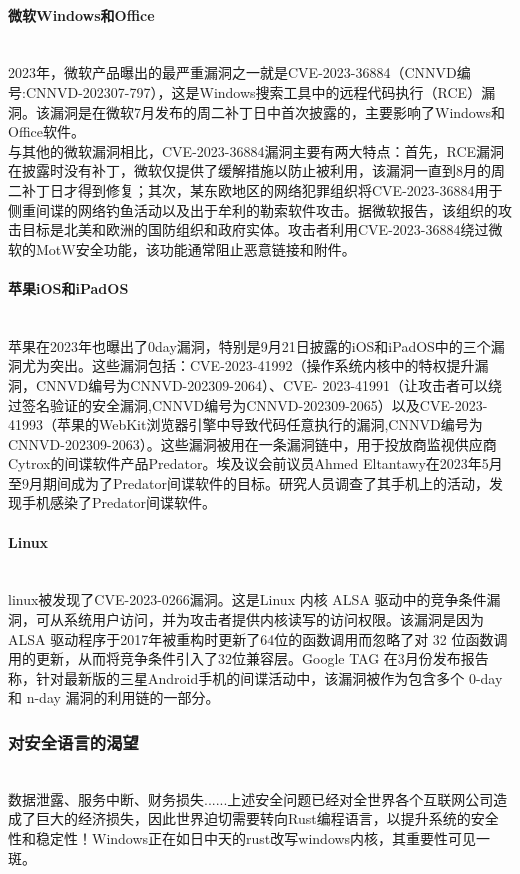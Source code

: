 \paragraph{微软Windows和Office}\ \\
 \indent 2023年，微软产品曝出的最严重漏洞之一就是CVE-2023-36884（CNNVD编号:CNNVD-202307-797），这是Windows搜索工具中的远程代码执行（RCE）漏洞。该漏洞是在微软7月发布的周二补丁日中首次披露的，主要影响了Windows和Office软件。\\
\indent 与其他的微软漏洞相比，CVE-2023-36884漏洞主要有两大特点：首先，RCE漏洞在披露时没有补丁，微软仅提供了缓解措施以防止被利用，该漏洞一直到8月的周二补丁日才得到修复；其次，某东欧地区的网络犯罪组织将CVE-2023-36884用于侧重间谍的网络钓鱼活动以及出于牟利的勒索软件攻击。据微软报告，该组织的攻击目标是北美和欧洲的国防组织和政府实体。攻击者利用CVE-2023-36884绕过微软的MotW安全功能，该功能通常阻止恶意链接和附件。\cite{15}
\paragraph{苹果iOS和iPadOS}\ \\
\indent 苹果在2023年也曝出了0day漏洞，特别是9月21日披露的iOS和iPadOS中的三个漏洞尤为突出。这些漏洞包括：CVE-2023-41992（操作系统内核中的特权提升漏洞，CNNVD编号为CNNVD-202309-2064）、CVE- 2023-41991（让攻击者可以绕过签名验证的安全漏洞,CNNVD编号为CNNVD-202309-2065）以及CVE-2023-41993（苹果的WebKit浏览器引擎中导致代码任意执行的漏洞,CNNVD编号为CNNVD-202309-2063）。这些漏洞被用在一条漏洞链中，用于投放商监视供应商Cytrox的间谍软件产品Predator。埃及议会前议员Ahmed Eltantawy在2023年5月至9月期间成为了Predator间谍软件的目标。研究人员调查了其手机上的活动，发现手机感染了Predator间谍软件。
\paragraph{Linux}\ \\
\indent linux被发现了CVE-2023-0266漏洞。这是Linux 内核 ALSA 驱动中的竞争条件漏洞，可从系统用户访问，并为攻击者提供内核读写的访问权限。该漏洞是因为 ALSA 驱动程序于2017年被重构时更新了64位的函数调用而忽略了对 32 位函数调用的更新，从而将竞争条件引入了32位兼容层。Google TAG 在3月份发布报告称，针对最新版的三星Android手机的间谍活动中，该漏洞被作为包含多个 0-day 和 n-day 漏洞的利用链的一部分。\cite{15}
\subsubsection{对安全语言的渴望}\ \\
\indent 数据泄露、服务中断、财务损失......上述安全问题已经对全世界各个互联网公司造成了巨大的经济损失，因此世界迫切需要转向Rust编程语言，以提升系统的安全性和稳定性！Windows正在如日中天的rust改写windows内核，其重要性可见一斑。

